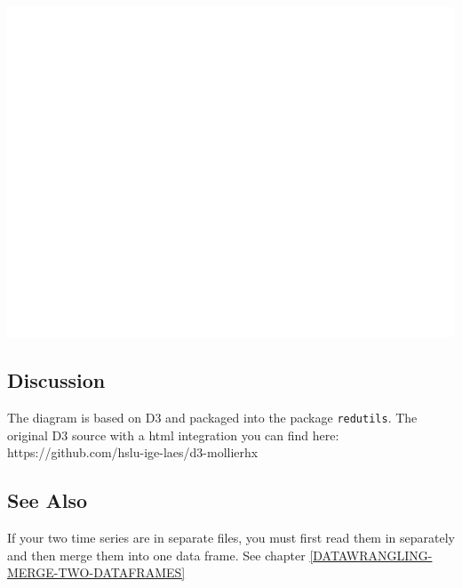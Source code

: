 \documentclass[
]{book}
\begin{document}
\includegraphics{edar_files/figure-latex/mollier hx-1.pdf}

\hypertarget{discussion}{%
\subsection{Discussion}\label{discussion}}

The diagram is based on D3 and packaged into the package \texttt{redutils}. The original D3 source with a html integration you can find here: https://github.com/hslu-ige-laes/d3-mollierhx

\hypertarget{see-also}{%
\subsection{See Also}\label{see-also}}

If your two time series are in separate files, you must first read them in separately and then merge them into one data frame. See chapter \ref{DATAWRANGLING-MERGE-TWO-DATAFRAMES}

  
\end{document}
